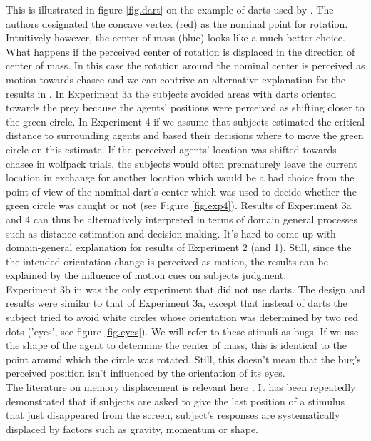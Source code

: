 \documentclass{article}
\begin{document}
This is illustrated in figure \ref{fig.dart} on the example of darts used by \citet{gao10}. 
The authors designated the concave vertex (red) as the nominal point for rotation. 
Intuitively however, the center of mass (blue) looks like a much better choice. 
What happens if the perceived center of rotation is displaced in the direction of center of mass.
In this case the rotation around the nominal center is perceived as motion towards chasee and we can contrive an alternative explanation for the results in \citet{gao10}. 
In Experiment 3a the subjects avoided areas with darts oriented towards the prey because the agents' positions were perceived as shifting closer to the green circle. 
In Experiment 4 if we assume that subjects estimated the critical distance to surrounding agents and based their decisions where to move the green circle on this estimate. 
If the perceived agents' location was shifted towards chasee in wolfpack trials, the subjects would often prematurely leave the current location in exchange for another location which would be a bad choice from the point of view of the nominal dart's center which was used to decide whether the green circle was caught or not (see Figure \ref{fig.exp4}). 
Results of Experiment 3a and 4 can thus be alternatively interpreted in terms of domain general processes such as distance estimation and decision making. 
It's hard to come up with domain-general explanation for results of Experiment 2 (and 1). 
Still, since the the intended orientation change is perceived as motion, the results can be explained by the influence of motion cues on subjects judgment.\\
Experiment 3b in \citet{gao10} was the only experiment that did not use darts. 
The design and results were similar to that of Experiment 3a, except that instead of darts the subject tried to avoid white circles whose orientation was determined by two red dots ('eyes', see figure \ref{fig.eyes}).
We will refer to these stimuli as bugs. 
If we use the shape of the agent to determine the center of mass, this is identical to the point around which the circle was rotated. 
Still, this doesn't mean that the bug's perceived position isn't influenced by the orientation of its eyes.\\
The literature on memory displacement is relevant here \citep{hubbard05}. 
It has been repeatedly demonstrated that if subjects are asked to give the last position of a stimulus that just disappeared from the screen, subject's responses are systematically displaced by factors such as gravity, momentum or shape. 
\end{document}
